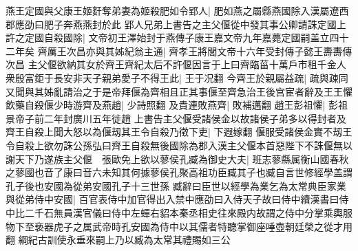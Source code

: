 燕王定國與父康王姬姧奪弟妻為姬殺肥如令郢人|{
	肥如燕之屬縣燕國除入漢屬遼西郡應劭曰肥子奔燕燕封於此}
郢人兄弟上書告之主父偃從中發其事公卿請誅定國上許之定國自殺國除|{
	文帝初王澤始封于燕傳子康王嘉文帝九年嘉薨定國嗣盖立四十二年矣}
齊厲王次昌亦與其姊紀翁主通|{
	齊孝王將閭文帝十六年受封傳子懿王夀夀傳次昌}
主父偃欲納其女於齊王齊紀太后不許偃因言于上曰齊臨菑十萬戶市租千金人衆殷富鉅于長安非天子親弟愛子不得王此|{
	王于况翻}
今齊王於親屬益疏|{
	疏與疎同}
又聞與其姊亂請治之于是帝拜偃為齊相且正其事偃至齊急治王後宫宦者辭及王王懼飲藥自殺偃少時游齊及燕趙|{
	少詩照翻}
及貴連敗燕齊|{
	敗補邁翻}
趙王彭祖懼|{
	彭祖景帝子前二年封廣川五年徙趙}
上書告主父偃受諸侯金以故諸侯子弟多以得封者及齊王自殺上聞大怒以為偃刼其王令自殺乃徵下吏|{
	下遐嫁翻}
偃服受諸侯金實不刼王令自殺上欲勿誅公孫弘曰齊王自殺無後國除為郡入漢主父偃本首惡陛下不誅偃無以謝天下乃遂族主父偃　張歐免上欲以蓼侯孔臧為御史大夫|{
	班志蓼縣属衡山國春秋之蓼國也音了康曰音六未知其何據蓼侯孔聚高祖功臣臧其子也臧自言世修經學盖謂孔子後也安國為從弟安國孔子十三世孫}
臧辭曰臣世以經學為業乞為太常典臣家業與從弟侍中安國|{
	百官表侍中加官得出入禁中應劭曰入侍天子故曰侍中續漢書曰侍中比二千石無員漢官儀曰侍中左蟬右貂本秦丞相史往來殿内故謂之侍中分掌乘輿服物下至亵器虎子之属武帝時孔安國為侍中以其儒者特聽掌御座唾壺朝廷榮之從才用翻}
綱紀古訓使永垂來嗣上乃以臧為太常其禮賜如三公

